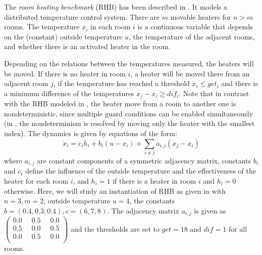 \documentclass{llncs}
\begin{document}
\begin{example} \label{ex:rhb}
The \emph{room heating benchmark} (RHB) has been described in
\cite{FI:2004}. It models a distributed temperature control
system. There are $m$ movable heaters for $n > m$ rooms. The
temperature $x_i$ in each room $i$ is a continuous variable that
depends on the (constant) outside temperature $u$, the temperature of
the adjacent rooms, and whether there is an activated heater in the
room.

Depending on the relations between the temperatures measured,
the heaters will be moved. If there is no heater in room $i$, a heater
will be moved there from an adjacent room $j$, if the temperature has
reached a threshold $x_i \leq get_i$ and there is a minimum difference
of the temperatures $x_j - x_i \geq dif_i$.  Note that in contrast
with the RHB modeled in \cite{AKRS:2008}, the heater move from a room
to another one is nondeterministic, since multiple guard conditions
can be enabled simultaneously (in \cite{AKRS:2008}, the nondeterminism
is resolved by moving only the heater with the smallest index).
%
The dynamics is given by equations of the form:
\begin{equation}\label{eq:rhb}
  \dot{x}_i = c_i h_i + b_i (u - x_i) + \sum \limits_{i\neq j} a_{i,j}(x_j - x_i)
\end{equation}
where $a_{i,j}$ are constant components of a symmetric adjacency
matrix, constants $b_i$ and $c_i$ define the influence of the outside
temperature and the effectiveness of the heater for each room $i$, and
$h_i = 1$ if there is a heater in room $i$ and $h_i = 0$ otherwise.
%
Here, we will study an instantiation of RHB as given in
\cite{AKRS:2008} with $n=3, m=2$, outside temperature $u=4$, the
constants $b = (0.4, 0.3, 0.4), c = (6,7,8)$. The adjacency matrix
$a_{i,j}$ is given as $\left(\begin{smallmatrix}
      0.0 \;\; & 0.5 & \;\; 0.0 \\
      0.5 \;\; & 0.0 & \;\; 0.5 \\
      0.0 \;\; & 0.5 & \;\; 0.0 \\
\end{smallmatrix}\right)$
and the thresholds are set to $get = 18$ and $dif = 1$ for all rooms.

\begin{figure}[tb]
  \centering
  \footnotesize
  \begin{tikzpicture}[->,>=stealth']


\end{tikzpicture}
\end{figure}
\end{example}
\end{document}
